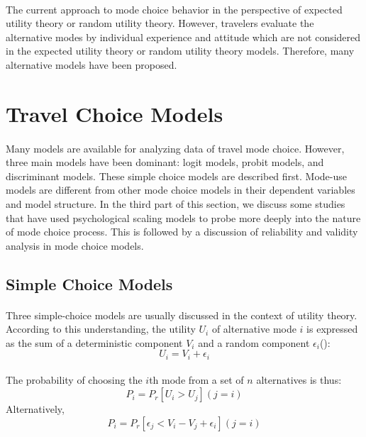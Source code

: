 


\paragraph{}The current approach to mode choice behavior
in the perspective of expected utility theory or random utility theory. However, travelers evaluate the alternative modes by individual experience and attitude which are not considered in the expected utility theory or random utility theory models. Therefore, many alternative models have been proposed.
\clearpage
\section{Travel Choice Models}
\paragraph{}Many models are available for analyzing data of travel mode choice. However, three main models have been dominant: logit models, probit models, and discriminant models. These simple choice models are described first. Mode-use models are different from other mode choice models in their dependent variables and model structure. In the third part of this section, we discuss some studies that have used psychological scaling models to probe more deeply into the nature of mode choice process. This is followed by a discussion of reliability and validity analysis in mode choice models.

\subsection{Simple Choice Models}
\paragraph{}Three simple-choice models are usually discussed in the context of utility theory. According to this understanding, the utility $U_i$ of alternative mode $i$ is expressed as the sum of a deterministic component $V_i$ and a random component $\epsilon_i$(\cite{Richard, David, 1982}):
\begin{equation}
U_i = V_i + \epsilon_i
\end{equation}
\paragraph{} The probability of choosing the $i$th mode from a set of $n$ alternatives is thus:
\begin{equation}
P_i = P_r[U_i>U_j](j=i)
\end{equation}
Alternatively, 
\begin{equation}\label{eq:3}
P_i = P_r[\epsilon_j < V_i - V_j + \epsilon_i](j=i)
\end{equation}
